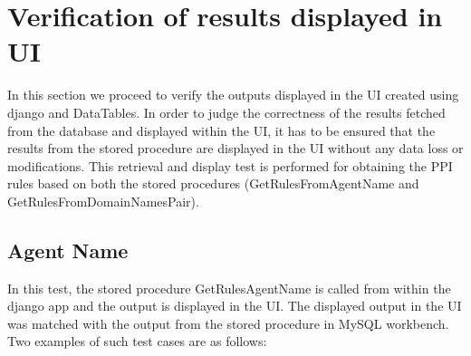 \documentclass[msc,deptreport,ai]{infthesis}      %
\begin{document}
\section {Verification of results displayed in UI}
In this section we proceed to verify the outputs displayed in the UI created using django and DataTables. In order to judge the correctness of the results fetched from the database and displayed within the UI, it has to be ensured that the results from the stored procedure are displayed in the UI without any data loss or modifications. This retrieval and display test is performed for obtaining the PPI rules based on both the stored procedures (GetRulesFromAgentName and GetRulesFromDomainNamesPair).

\subsection{Agent Name}
In this test, the stored procedure GetRulesAgentName is called from within the django app and the output is displayed in the UI. The displayed output in the UI was matched with the output from the stored procedure in MySQL workbench.\\ Two examples of such test cases are as follows:
\end{document}
